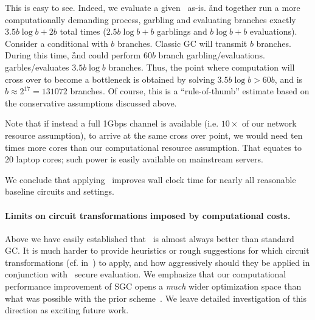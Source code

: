 This is easy to see.  Indeed, we evaluate a given \cir\ as-is.  \G and \E together 
run a more computationally demanding  process, garbling and evaluating 
branches exactly $3.5 b \log b + 2b$ total times ($2.5 b \log b + b$ garblings and $ b \log b + b$  evaluations).  Consider a
conditional with $b$ branches.  Classic GC will transmit $b$ branches.
During this time, \G and \E could perform $60 b$ branch garbling/evaluations. 
\ourschemelong  garbles/evaluates $3.5 b \log b$ branches.  Thus,  the point where
computation will cross over to become a bottleneck is obtained by solving $3.5b \log b > 60 b$, and is $b \approx 2^{17} = 131072$
branches.  Of course, this is a ``rule-of-thumb'' estimate based on the conservative assumptions discussed above.

Note that if instead a full 1Gbps channel is available (i.e. $10\times$ of our network resource assumption),  to arrive at the same cross over  point, we would need ten times more cores than our computational resource assumption.  That equates to $20$ laptop cores; such power is easily available on mainstream servers.

We conclude that applying \ourschemelong\ improves wall clock
time for nearly all reasonable baseline circuits and settings.


\paragraph{Limits on circuit transformations imposed by computational costs.}
Above we have easily  established that \ourschemelong\ is almost always
better than standard GC.   It is much harder to provide heuristics or
rough suggestions for which circuit transformations (cf.
in~) to apply, and how aggressively should
they be applied in conjunction with \ourschemelong\ secure evaluation.  We
emphasize that our computational performance improvement of SGC opens
a {\em much} wider optimization space than what was possible with the
prior scheme~\HK.  We leave detailed investigation of this direction
as exciting future work.






